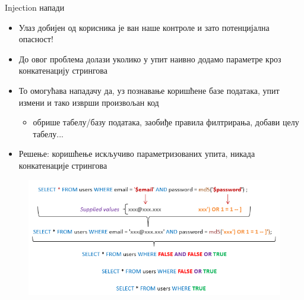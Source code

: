 \documentclass{beamer}
\begin{document}
    \begin{frame}[allowframebreaks]{Injection напади}
        \begin{itemize}
            \item Улаз добијен од корисника је ван наше контроле и зато потенцијална опасност!
            \item До овог проблема долази уколико у упит наивно додамо параметре кроз конкатенацију стрингова
            \item То омогућава нападачу да, уз познавање коришћене базе података, упит измени и тако изврши произвољан код
            \begin{itemize}
                \item обрише табелу/базу података, заобиђе правила филтрирања, добави целу табелу...
            \end{itemize}
            \item Решење: коришћење искључиво параметризованих упита, никада конкатенације стрингова
        \end{itemize}
        
        \framebreak
        
        \begin{figure}
            \centering
            \includegraphics[width=\textwidth,height=0.7\textheight,keepaspectratio]{images/sqlinjection.png}
            \label{fig:sqlinjection}
        \end{figure}
    \end{frame}
    
\end{document}
